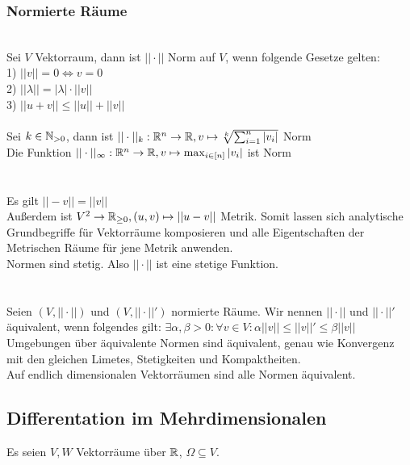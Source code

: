 \subsubsection*{Normierte Räume}
 \\
Sei \(V\) Vektorraum, dann ist \(||\cdot||\) Norm auf \(V\), wenn folgende Gesetze gelten:\\
1) \(||v|| = 0 \Longleftrightarrow v = 0\) \\
2) \(||\lambda|| = |\lambda| \cdot ||v||\) \\
3) \(||u+v|| \le ||u|| + ||v||\) \pagebreak \\
 \\
Sei \(k \in \mathbb N_{> 0}\), dann ist \(||\cdot||_k : \mathbb R^n \rightarrow \mathbb R, v \mapsto \sqrt[k]{\sum_{i=1}^{n}|v_i|}\) Norm \\
Die Funktion \(||\cdot||_\infty : \mathbb R^n \rightarrow \mathbb R, v \mapsto \max_{i \in [n]}|v_i|\) ist Norm \\ \\
 \\
Es gilt \(||-v|| = ||v||\) \\
Außerdem ist \(V^2 \rightarrow \mathbb R_{\ge 0}, (u,v) \mapsto ||u-v||\) Metrik. Somit lassen sich analytische Grundbegriffe für Vektorräume komposieren und alle Eigentschaften der Metrischen Räume für jene Metrik anwenden. \\
Normen sind stetig. Also \(||\cdot||\) ist eine stetige Funktion. \\ \\
 \\
Seien \((V, ||\cdot||)\) und \((V, ||\cdot||')\) normierte Räume. Wir nennen \(||\cdot||\) und \(||\cdot||'\) äquivalent, wenn folgendes gilt: \(\exists \alpha,\beta > 0: \forall v \in V: \alpha ||v|| \le ||v||' \le \beta||v||\) \\
Umgebungen über äquivalente Normen sind äquivalent, genau wie Konvergenz mit den gleichen Limetes, Stetigkeiten und Kompaktheiten. \\
Auf endlich dimensionalen Vektorräumen sind alle Normen äquivalent.
\subsection*{Differentation im Mehrdimensionalen}
Es seien \(V, W\) Vektorräume über \(\mathbb R\), \(\Omega \subseteq V\).
